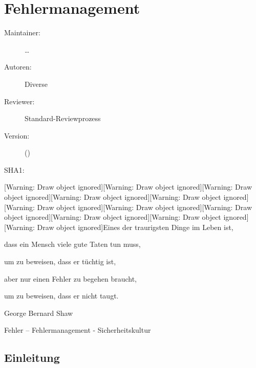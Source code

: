 \def\ChapterCode{FORTBILDUNG}
	\chapter
[\CO{[FORTBILDUNG]} Fehlermanagement]
{Fehlermanagement}
\label{chp:ADVANCED-Fehlermanagement}

\ChapterIntro
{%

}
{%
\begin{description}
  \item[Maintainer:] \ldots
  \item[Autoren:] Diverse
  \item[Reviewer:] Standard-Reviewprozess
  \item[Version:] {\VarDocVersionTypeName} ({\VarDocVersionTypeDescription})
  \item[SHA1:] {\DocGitCommit}
\end{description}

{\TxTeilkapitelAASS}}



\clearpage %



[Warning: Draw object ignored][Warning: Draw object
ignored][Warning: Draw object ignored][Warning: Draw object
ignored][Warning: Draw object ignored][Warning: Draw object
ignored][Warning: Draw object ignored][Warning: Draw object
ignored][Warning: Draw object ignored][Warning: Draw object
ignored][Warning: Draw object ignored]Eines der traurigsten
Dinge im Leben ist,

\begin{figure}

\end{figure}
dass ein Mensch viele gute Taten tun muss,

um zu beweisen, dass er tüchtig ist,

aber nur einen Fehler zu begehen braucht,

um zu beweisen, dass er nicht taugt.

George Bernard Shaw




Fehler – Fehlermanagement - Sicherheitskultur




\section{Einleitung}

